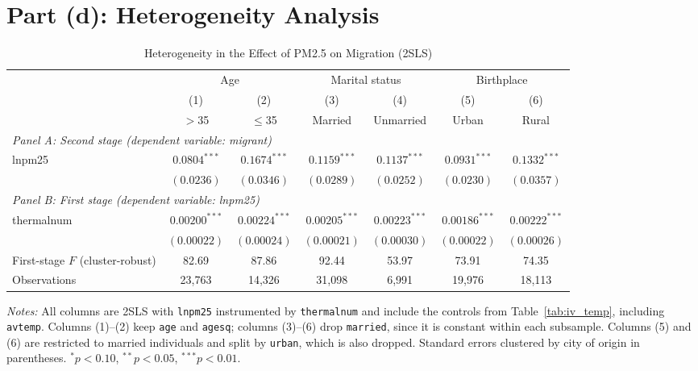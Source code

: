 \documentclass[11pt]{article}
\begin{document}
\section*{Part (d): Heterogeneity Analysis}

\begin{table}[H]
\centering
\begin{threeparttable}
\caption{Heterogeneity in the Effect of PM2.5 on Migration (2SLS)}
\label{tab:het}
\small
\setlength{\tabcolsep}{4pt}
\begin{tabular}{lcccccc}
\toprule
 & \multicolumn{2}{c}{Age} & \multicolumn{2}{c}{Marital status} & \multicolumn{2}{c}{Birthplace} \\
\cmidrule(lr){2-3}\cmidrule(lr){4-5}\cmidrule(lr){6-7}
 & (1) & (2) & (3) & (4) & (5) & (6) \\
 & $>$35 & $\le$35 & Married & Unmarried & Urban & Rural \\
\midrule
\multicolumn{7}{l}{\textit{Panel A: Second stage (dependent variable: migrant)}} \\
lnpm25 & $0.0804^{***}$ & $0.1674^{***}$ & $0.1159^{***}$ & $0.1137^{***}$ & $0.0931^{***}$ & $0.1332^{***}$ \\
 & $(0.0236)$ & $(0.0346)$ & $(0.0289)$ & $(0.0252)$ & $(0.0230)$ & $(0.0357)$ \\
\midrule
\multicolumn{7}{l}{\textit{Panel B: First stage (dependent variable: lnpm25)}} \\
thermalnum & $0.00200^{***}$ & $0.00224^{***}$ & $0.00205^{***}$ & $0.00223^{***}$ & $0.00186^{***}$ & $0.00222^{***}$ \\
 & $(0.00022)$ & $(0.00024)$ & $(0.00021)$ & $(0.00030)$ & $(0.00022)$ & $(0.00026)$ \\
First-stage $F$ (cluster-robust) & 82.69 & 87.86 & 92.44 & 53.97 & 73.91 & 74.35 \\
\midrule
Observations & 23,763 & 14,326 & 31,098 & 6,991 & 19,976 & 18,113 \\
\bottomrule
\end{tabular}
\begin{tablenotes}\footnotesize
\item \textit{Notes:} All columns are 2SLS with \texttt{lnpm25} instrumented by \texttt{thermalnum} and include the controls from Table~\ref{tab:iv_temp}, including \texttt{avtemp}. Columns (1)--(2) keep \texttt{age} and \texttt{agesq}; columns (3)--(6) drop \texttt{married}, since it is constant within each subsample. Columns (5) and (6) are restricted to married individuals and split by \texttt{urban}, which is also dropped. Standard errors clustered by city of origin in parentheses. $^{*}p<0.10$, $^{**}p<0.05$, $^{***}p<0.01$.
\end{tablenotes}
\end{threeparttable}
\end{table}
\end{document}
